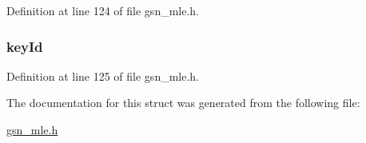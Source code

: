 Definition at line 124 of file gsn\_\-mle.h.

\hypertarget{a00153_a0ac00f9d4c8c313ac0e64a514b6c3d3c}{
\subsubsection[{keyId}]{ {\bf keyId}}}
\label{a00153_a0ac00f9d4c8c313ac0e64a514b6c3d3c}


Definition at line 125 of file gsn\_\-mle.h.



The documentation for this struct was generated from the following file:\begin{DoxyCompactItemize}
\item 
\hyperlink{a00527}{gsn\_\-mle.h}\end{DoxyCompactItemize}
